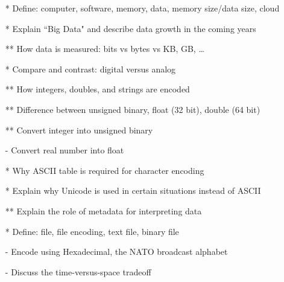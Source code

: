 \documentclass[12pt]{article}%
\begin{document}
\begin{itemize}[noitemsep]
 \setlength{\itemsep}{1pt}%
    \setlength{\parskip}{1pt}
\item[*] Define: computer, software, memory, data, memory size/data size, cloud
\item[*] Explain ``Big Data" and describe data growth in the coming years
\item[**] How data is measured: bits vs bytes vs KB, GB, \dots
\item[*] Compare and contrast: digital versus analog
\item[**] How integers, doubles, and strings are encoded
\item[**] Difference between unsigned binary, float (32 bit), double (64 bit)
\item[**] Convert integer into unsigned binary
\item[-] Convert real number into float
\item[*] Why ASCII table is required for character encoding
\item[*] Explain why Unicode is used in certain situations instead of ASCII
\item[**] Explain the role of metadata for interpreting data
\item[*] Define: file, file encoding, text file, binary file
    \item[-]  Encode using  Hexadecimal, the NATO broadcast alphabet
    \item[-]  Discuss the time-versus-space tradeoff
    \end{itemize}
\end{document}
